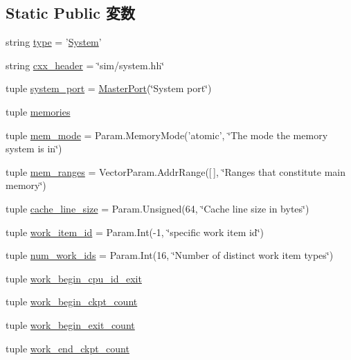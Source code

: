 \subsection*{Static Public 変数}
\begin{DoxyCompactItemize}
\item 
string \hyperlink{classSystem_1_1System_acce15679d830831b0bbe8ebc2a60b2ca}{type} = '\hyperlink{classSystem_1_1System}{System}'
\item 
string \hyperlink{classSystem_1_1System_a17da7064bc5c518791f0c891eff05fda}{cxx\_\-header} = \char`\"{}sim/system.hh\char`\"{}
\item 
tuple \hyperlink{classSystem_1_1System_ac1b872638c5b453dbc59423eb0e07188}{system\_\-port} = \hyperlink{classMasterPort}{MasterPort}(\char`\"{}System port\char`\"{})
\item 
tuple \hyperlink{classSystem_1_1System_a0ebb0343c16ba35f99eb82a31a3abed7}{memories}
\item 
tuple \hyperlink{classSystem_1_1System_a21e44df1e95121269e2d9c56bed48f0b}{mem\_\-mode} = Param.MemoryMode('atomic', \char`\"{}The mode the memory system is in\char`\"{})
\item 
tuple \hyperlink{classSystem_1_1System_adf7ea00bee2082f49501f7f326c856c8}{mem\_\-ranges} = VectorParam.AddrRange(\mbox{[}$\,$\mbox{]}, \char`\"{}Ranges that constitute main memory\char`\"{})
\item 
tuple \hyperlink{classSystem_1_1System_a9ee7a697c8960b2b71fea23da5092cf9}{cache\_\-line\_\-size} = Param.Unsigned(64, \char`\"{}Cache line size in bytes\char`\"{})
\item 
tuple \hyperlink{classSystem_1_1System_aec87888c90a4acd146cbc30d2657de7f}{work\_\-item\_\-id} = Param.Int(-\/1, \char`\"{}specific work item id\char`\"{})
\item 
tuple \hyperlink{classSystem_1_1System_a505fd78bb6593c92f840f452741a8c42}{num\_\-work\_\-ids} = Param.Int(16, \char`\"{}Number of distinct work item types\char`\"{})
\item 
tuple \hyperlink{classSystem_1_1System_a2c4c04f4d52a246f8614d62e1e47ef6a}{work\_\-begin\_\-cpu\_\-id\_\-exit}
\item 
tuple \hyperlink{classSystem_1_1System_a4c6744a2f66abf58ecfc3034831c2414}{work\_\-begin\_\-ckpt\_\-count}
\item 
tuple \hyperlink{classSystem_1_1System_acd4a2ddc9e02b223901ffd00d09cf1bf}{work\_\-begin\_\-exit\_\-count}
\item 
tuple \hyperlink{classSystem_1_1System_a41ca1424c9033eaa34c85ac0e025e742}{work\_\-end\_\-ckpt\_\-count}

\end{DoxyCompactItemize}
